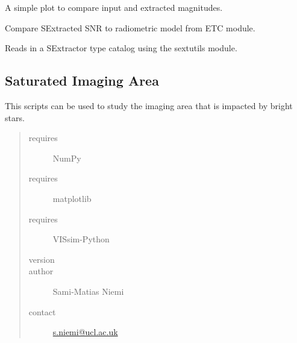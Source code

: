\documentclass[a4paper,11pt,english]{sphinxmanual}
\begin{document}

\begin{fulllineitems}
\label{analysis:analysis.compareSNRs.compareMagnitudes}
A simple plot to compare input and extracted magnitudes.

\end{fulllineitems}


\begin{fulllineitems}
\label{analysis:analysis.compareSNRs.compareSNR}
Compare SExtracted SNR to radiometric model from ETC module.

\end{fulllineitems}


\begin{fulllineitems}
\label{analysis:analysis.compareSNRs.readCatalog}
Reads in a SExtractor type catalog using the sextutils module.

\end{fulllineitems}

\label{analysis:module-analysis.saturatedArea}

\subsection{Saturated Imaging Area}
\label{analysis:saturated-imaging-area}
This scripts can be used to study the imaging area that is impacted by bright stars.
\begin{quote}\begin{description}
\item[{requires}] \leavevmode
NumPy

\item[{requires}] \leavevmode
matplotlib

\item[{requires}] \leavevmode
VISsim-Python

\item[{version}] 

\item[{author}] \leavevmode
Sami-Matias Niemi

\item[{contact}] \leavevmode
\href{mailto:s.niemi@ucl.ac.uk}{s.niemi@ucl.ac.uk}

\end{description}\end{quote}
\end{document}
